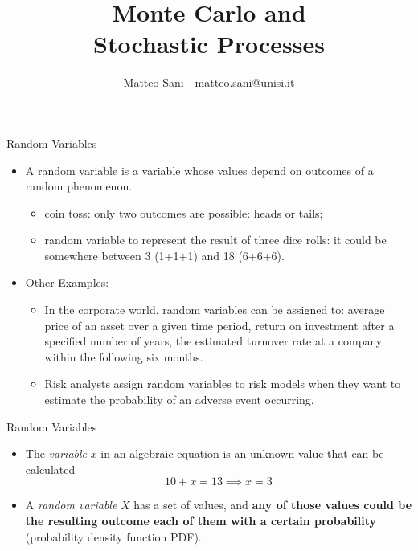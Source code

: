 \documentclass{beamer}
\title{Monte Carlo and \\ \vspace{0.25cm}Stochastic Processes}
\author{Matteo Sani - \href{mailto:matteo.sani@unisi.it}{matteo.sani@unisi.it}}
\begin{document}
\begin{frame}[plain]
	\maketitle
\end{frame}

\begin{frame}{Random Variables}
	\begin{itemize}
		\item A random variable is a variable whose values depend on outcomes of a random phenomenon.
        \begin{itemize}
        \item coin toss: only two outcomes are possible: heads or tails;
        \item random variable to represent the result of three dice rolls: it could be somewhere between 3 (1+1+1) and 18 (6+6+6).
        \end{itemize}

        \item Other Examples:
        \begin{itemize}
            \item In the corporate world, random variables can be assigned to: average price of an asset over a given time period, return on investment after a specified number of years, the estimated turnover rate at a company within the following six months. 
            \item Risk analysts assign random variables to risk models when they want to estimate the probability of an adverse event occurring.
        \end{itemize}
	\end{itemize}
\end{frame}

\begin{frame}{Random Variables}
	\begin{itemize}
		\item The \emph{variable} $x$ in an algebraic equation is an unknown value that can be calculated 
        \begin{equation*}
        10 + x = 13 \implies x=3
        \end{equation*}
        \item A \emph{random variable} $X$ has a set of values, and \textbf{any of those values could be the resulting outcome each of them with a certain probability} (probability density function PDF).
	\end{itemize}
\end{frame}
\end{document}

